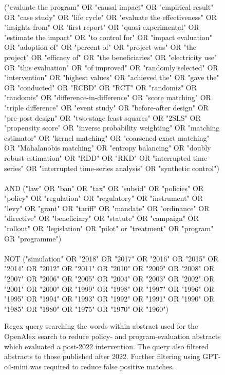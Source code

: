 \documentclass[12pt,a4paper]{article}
\begin{document}
\begin{figure}[htbp]
  \centering
  \begin{tcolorbox}[left=4pt, right=4pt, top=4pt, bottom=4pt]
\ttfamily\footnotesize
("evaluate the program" OR "causal impact" OR "empirical result" OR "case study" OR "life cycle" OR "evaluate the effectiveness" OR "insights from" OR "first report" OR "quasi-experimental" OR "estimate the impact" OR "to control for" OR "impact evaluation" OR "adoption of" OR "percent of" OR "project was" OR "the project" OR "efficacy of" OR "the beneficiaries" OR "electricity use" OR "this evaluation" OR "of improved" OR "randomly selected" OR "intervention" OR "highest values" OR "achieved the" OR "gave the" OR "conducted" OR "RCBD" OR "RCT" OR "randomiz" OR "randomis" OR "difference-in-difference" OR "score matching" OR "triple difference" OR "event study" OR "before-after design" OR "pre-post design" OR "two-stage least squares" OR "2SLS" OR "propensity score" OR "inverse probability weighting" OR "matching estimator" OR "kernel matching" OR "coarsened exact matching" OR "Mahalanobis matching" OR "entropy balancing" OR "doubly robust estimation" OR "RDD" OR "RKD" OR "interrupted time series" OR "interrupted time-series analysis" OR "synthetic control") \\ \\ 
AND ("law" OR "ban" OR "tax" OR "subsid" OR "policies" OR "policy" OR "regulation" OR "regulatory" OR "instrument" OR "levy" OR "grant" OR "tariff" OR "mandate" OR "ordinance" OR "directive" OR "beneficiary" OR "statute" OR "campaign" OR "rollout" OR "legislation" OR "pilot" or "treatment" OR "program" OR "programme") \\ \\
NOT ("simulation" OR "2018" OR "2017" OR "2016" OR "2015" OR "2014" OR "2012" OR "2011" OR "2010" OR "2009" OR "2008" OR "2007" OR "2006" OR "2005" OR "2004" OR "2003" OR "2002" OR "2001" OR "2000" OR "1999" OR "1998" OR "1997" OR "1996" OR "1995" OR "1994" OR "1993" OR "1992" OR "1991" OR "1990" OR "1985" OR "1980" OR "1975" OR "1970" OR "1960")
  \end{tcolorbox}
  \caption{Regex query searching the words within abstract used for the OpenAlex search to reduce policy‐ and program‐evaluation abstracts which evaluated a post-2022 intervention. The query also filtered abstracts to those published after 2022. Further filtering using GPT-o4-mini was required to reduce false positive matches.}
  \label{fig:OpenAlex-query}
\end{figure}
\end{document}
